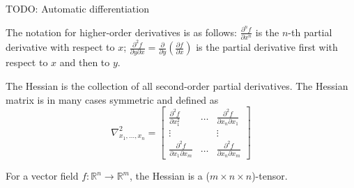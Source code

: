 TODO: Automatic differentiation

The notation for higher-order derivatives is as follows:
$\frac{\partial^n f}{\partial x^n}$ is the $n$-th partial derivative with respect to $x$;
$\frac{\partial^2 f}{\partial y \partial x} = \frac{\partial}{\partial y} \left( \frac{\partial f}{\partial x} \right)$ is the partial derivative first with respect to $x$ and then to $y$.

The Hessian is the collection of all second-order partial derivatives.
The Hessian matrix is in many cases symmetric and defined as
\begin{equation*}
    \nabla^2_{x_1, \dotsc, x_n} =
    \begin{bmatrix}
        \frac{\partial^2 f}{\partial x_1^2} & \dots & \frac{\partial^2 f}{\partial x_n \partial x_1} \\
        \vdots & & \vdots \\
        \frac{\partial^2 f}{\partial x_1 \partial x_m} & \dots & \frac{\partial^2 f}{\partial x_n \partial x_m}
    \end{bmatrix}
\end{equation*}

For a vector field $f : \mathbb{R}^{n} \to \mathbb{R}^m$,
the Hessian is a ($m \times n \times n$)-tensor.
